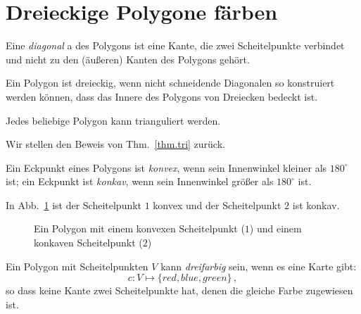 \section{Dreieckige Polygone färben}\label{s.museum-triangulating}

\begin{definition}
Eine \emph{diagonal} a des Polygons ist eine Kante, die zwei Scheitelpunkte verbindet und nicht zu den (äußeren) Kanten des Polygons gehört.
\end{definition}

\begin{definition}
Ein Polygon ist dreieckig, wenn nicht schneidende Diagonalen so konstruiert werden können, dass das Innere des Polygons von Dreiecken bedeckt ist.
\end{definition}

\begin{theorem}
Jedes beliebige Polygon kann trianguliert werden.\label{thm.tri}
\end{theorem}
Wir stellen den Beweis von Thm.~\ref{thm.tri} zurück.
\begin{definition}
Ein Eckpunkt eines Polygons ist \emph{konvex}, wenn sein Innenwinkel kleiner als $180^\circ$ ist; ein Eckpunkt ist \emph{konkav}, wenn sein Innenwinkel größer als $180^\circ$ ist. 
\end{definition}
In Abb.~\ref{f.museum.arbitrary} ist der Scheitelpunkt $1$ konvex und der Scheitelpunkt $2$ ist konkav.

\begin{figure}[ht]
\begin{center}
\end{center}
\caption{Ein Polygon mit einem konvexen Scheitelpunkt ($1$) und einem konkaven Scheitelpunkt ($2$)}\label{f.museum.arbitrary}
\end{figure}

\begin{definition}
Ein Polygon mit Scheitelpunkten $V$ kann \emph{dreifarbig} sein, wenn es eine Karte gibt:
\[
c: V \mapsto \{\mathit{red},\mathit{blue},\mathit{green}\}\,,
\]
so dass keine Kante zwei Scheitelpunkte hat, denen die gleiche Farbe zugewiesen ist.
\end{definition}


